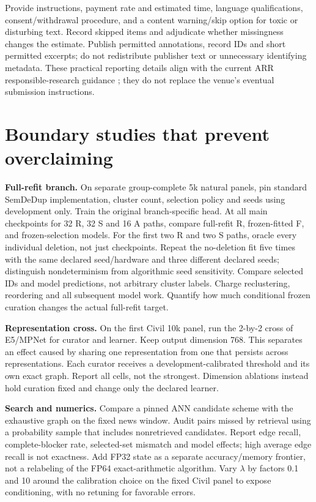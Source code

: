 \documentclass[11pt,a4paper]{article}
\begin{document}
Provide instructions, payment rate and estimated time, language qualifications, consent/withdrawal procedure, and a content warning/skip option for toxic or disturbing text. Record skipped items and adjudicate whether missingness changes the estimate. Publish permitted annotations, record IDs and short permitted excerpts; do not redistribute publisher text or unnecessary identifying metadata. These practical reporting details align with the current ARR responsible-research guidance \cite{arr}; they do not replace the venue's eventual submission instructions.

\section{Boundary studies that prevent overclaiming}
\textbf{Full-refit branch.} On separate group-complete 5k natural panels, pin standard SemDeDup implementation, cluster count, selection policy and seeds using development only. Train the original branch-specific head. At all main checkpoints for 32 R, 32 S and 16 A paths, compare full-refit R, frozen-fitted F, and frozen-selection models. For the first two R and two S paths, oracle every individual deletion, not just checkpoints. Repeat the no-deletion fit five times with the same declared seed/hardware and three different declared seeds; distinguish nondeterminism from algorithmic seed sensitivity. Compare selected IDs and model predictions, not arbitrary cluster labels. Charge reclustering, reordering and all subsequent model work. Quantify how much conditional frozen curation changes the actual full-refit target.

\textbf{Representation cross.} On the first Civil 10k panel, run the 2-by-2 cross of E5/MPNet for curator and learner. Keep output dimension 768. This separates an effect caused by sharing one representation from one that persists across representations. Each curator receives a development-calibrated threshold and its own exact graph. Report all cells, not the strongest. Dimension ablations instead hold curation fixed and change only the declared learner.

\textbf{Search and numerics.} Compare a pinned ANN candidate scheme with the exhaustive graph on the fixed news window. Audit pairs missed by retrieval using a probability sample that includes nonretrieved candidates. Report edge recall, complete-blocker rate, selected-set mismatch and model effects; high average edge recall is not exactness. Add FP32 state as a separate accuracy/memory frontier, not a relabeling of the FP64 exact-arithmetic algorithm. Vary $\lambda$ by factors 0.1 and 10 around the calibration choice on the fixed Civil panel to expose conditioning, with no retuning for favorable errors.
\end{document}
